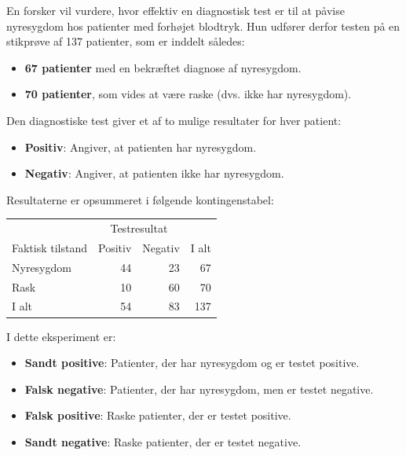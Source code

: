 \begin{example}
    En forsker vil vurdere, hvor effektiv en diagnostisk test er til at påvise nyresygdom hos patienter med forhøjet blodtryk. Hun udfører derfor testen på en stikprøve af 137 patienter, som er inddelt således:

\begin{itemize}
    \item \textbf{67 patienter} med en bekræftet diagnose af nyresygdom.
    \item \textbf{70 patienter}, som vides at være raske (dvs. ikke har nyresygdom).
\end{itemize}

Den diagnostiske test giver et af to mulige resultater for hver patient:

\begin{itemize}
    \item \textbf{Positiv}: Angiver, at patienten har nyresygdom.
    \item \textbf{Negativ}: Angiver, at patienten ikke har nyresygdom.
\end{itemize}

Resultaterne er opsummeret i følgende kontingenstabel:

    \begin{tabular}{lrrr} 
        & \multicolumn{2}{c}{ Testresultat } & \\
        Faktisk tilstand & Positiv & Negativ & I alt \\
        Nyresygdom & 44 & 23 & 67 \\
        Rask & 10 & 60 & 70 \\
        I alt & 54 & 83 & 137
        \end{tabular}
        
    I dette eksperiment er:


        \begin{itemize}
            \item \textbf{Sandt positive}: Patienter, der har nyresygdom og er testet positive.
            \item \textbf{Falsk negative}: Patienter, der har nyresygdom, men er testet negative.
            \item \textbf{Falsk positive}: Raske patienter, der er testet positive.
            \item \textbf{Sandt negative}: Raske patienter, der er testet negative.
        \end{itemize}
    

\end{example}
